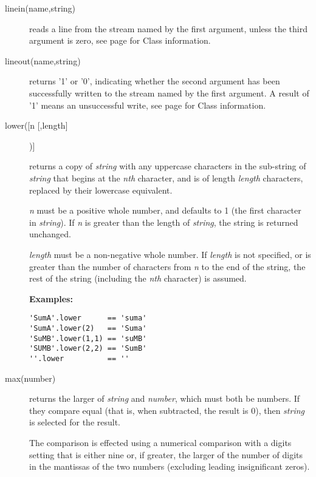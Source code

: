 \begin{description}
\item[linein(name,string)] reads a line from the stream named by the first argument,
unless the third argument is zero, see page \pageref{refrexxstream} for Class  information.

\item[lineout(name,string)] returns '1' or '0', indicating whether the second argument has been successfully written to the stream named by the first argument. A result of '1' means an unsuccessful write, see page \pageref{refrexxstream} for Class  information.

\item[lower([n [,length{]}])]\label{reflower}

returns a copy of \emph{string} with any uppercase characters in
the sub-string of \emph{string} that begins at the \emph{n}\emph{th}
character, and is of length \emph{length} characters, replaced by
their lowercase equivalent.
 
\emph{n} must be a positive whole number, and defaults to 1 (the
first character in \emph{string}).  If \emph{n} is greater than
the length of \emph{string}, the string is returned unchanged.
 
\emph{length} must be a non-negative whole number.
If \emph{length} is not specified, or is greater than the number of
characters from \emph{n} to the end of the string, the rest of the
string (including the \emph{n}\emph{th} character) is assumed.
 
\textbf{Examples:}
\begin{lstlisting}
'SumA'.lower      == 'suma'
'SumA'.lower(2)   == 'Suma'
'SuMB'.lower(1,1) == 'suMB'
'SUMB'.lower(2,2) == 'SumB'
''.lower          == ''
\end{lstlisting}

\item[max(number)]\label{refmax}

returns the larger of \emph{string} and \emph{number}, which
must both be numbers.  If they compare equal (that is, when subtracted,
the result is 0), then \emph{string} is selected for the result.
 
The comparison is effected using a numerical comparison with a digits
setting that is either nine or, if greater, the larger of the number of
digits in the mantissas of the two numbers (excluding leading
insignificant zeros).
 

\end{description}
